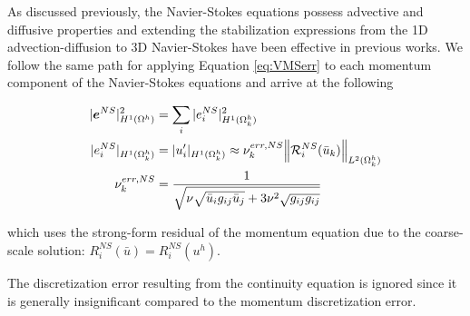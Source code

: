 \label{sec:VMS_NS}
As discussed previously, the Navier-Stokes equations possess advective and diffusive properties and extending the stabilization expressions from the 1D advection-diffusion to 3D Navier-Stokes have been effective in previous works.
We follow the same path for applying Equation \ref{eq:VMSerr} to each momentum component of the Navier-Stokes equations and arrive at the following

\begin{align}
    |\bm{e}^{NS}|^2_{H^{1}(\Omega^h)} &= \sum_{i}|e^{NS}_i|^2_{H^{1}(\Omega^h_k)} \\
    |e^{NS}_i|_{H^{1}(\Omega^h_k)} &= |u_i'|_{H^{1}(\Omega^h_k)} \approx \nu^{err,NS}_{k} \norm{\mathcal{R}^{NS}_i (\bar{u}_k)}_{L^2(\Omega^h_k)} \\
    \nu^{err,NS}_{k} &= \dfrac{1}{\sqrt{ \nu\sqrt{\bar{u}_i g_{ij} \bar{u}_j} + 3\nu^2\sqrt{g_{ij}g_{ij}}  }  } \\
    \label{eq:VMSerrNS}
\end{align} 

\noindent which uses the strong-form residual of the momentum equation due to the coarse-scale solution: $R^{NS}_i(\bar{u})=R^{NS}_i(u^h)$.

The discretization error resulting from the continuity equation is ignored since it is generally insignificant compared to the momentum discretization error.

\iffalse
One noticeable omission from the $\nu^{err}_e$ expression is any dependency on the time step, which is commonly found in stabilization expressions. 
As a reminder, the current form for the error-constant is derived from a steady-state advection-diffusion problem, and we are interested in the effectiveness of this current form.
Any extensions to the error-constant pave the way for future work.

This approach differs from previous work in that we use the $\HOne$-seminorm to measure the error whereas Hauke et al. \cite{hauke2008variational,hauke2015variational} focuses on the $L^2$ and $L^1$ norms. 
Moreover, we reach the form of the error constant through a direct extension of the 1D advection-diffusion setting to multidimensional settings which has not been done previously.
\fi


